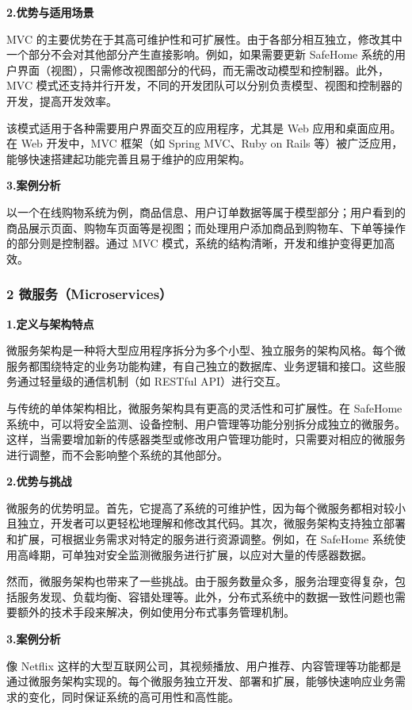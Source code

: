 \textbf{2.优势与适用场景}

MVC 的主要优势在于其高可维护性和可扩展性。由于各部分相互独立，修改其中一个部分不会对其他部分产生直接影响。例如，如果需要更新 SafeHome 系统的用户界面（视图），只需修改视图部分的代码，而无需改动模型和控制器。此外，MVC 模式还支持并行开发，不同的开发团队可以分别负责模型、视图和控制器的开发，提高开发效率。

该模式适用于各种需要用户界面交互的应用程序，尤其是 Web 应用和桌面应用。在 Web 开发中，MVC 框架（如 Spring MVC、Ruby on Rails 等）被广泛应用，能够快速搭建起功能完善且易于维护的应用架构。

\textbf{3.案例分析}

以一个在线购物系统为例，商品信息、用户订单数据等属于模型部分；用户看到的商品展示页面、购物车页面等是视图；而处理用户添加商品到购物车、下单等操作的部分则是控制器。通过 MVC 模式，系统的结构清晰，开发和维护变得更加高效。

\subsubsection{2 微服务（Microservices）}\label{ux5faeux670dux52a1microservices}

\textbf{1.定义与架构特点}

微服务架构是一种将大型应用程序拆分为多个小型、独立服务的架构风格。每个微服务都围绕特定的业务功能构建，有自己独立的数据库、业务逻辑和接口。这些服务通过轻量级的通信机制（如 RESTful API）进行交互。

与传统的单体架构相比，微服务架构具有更高的灵活性和可扩展性。在 SafeHome 系统中，可以将安全监测、设备控制、用户管理等功能分别拆分成独立的微服务。这样，当需要增加新的传感器类型或修改用户管理功能时，只需要对相应的微服务进行调整，而不会影响整个系统的其他部分。

\textbf{2.优势与挑战}

微服务的优势明显。首先，它提高了系统的可维护性，因为每个微服务都相对较小且独立，开发者可以更轻松地理解和修改其代码。其次，微服务架构支持独立部署和扩展，可根据业务需求对特定的服务进行资源调整。例如，在 SafeHome 系统使用高峰期，可单独对安全监测微服务进行扩展，以应对大量的传感器数据。

然而，微服务架构也带来了一些挑战。由于服务数量众多，服务治理变得复杂，包括服务发现、负载均衡、容错处理等。此外，分布式系统中的数据一致性问题也需要额外的技术手段来解决，例如使用分布式事务管理机制。

\textbf{3.案例分析}

像 Netflix 这样的大型互联网公司，其视频播放、用户推荐、内容管理等功能都是通过微服务架构实现的。每个微服务独立开发、部署和扩展，能够快速响应业务需求的变化，同时保证系统的高可用性和高性能。

